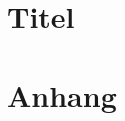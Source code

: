 \documentclass[a4paper,11pt,oneside]{book}
\begin{document}
\chapter{Titel}
\clearpage




\appendix		%
\chapter{Anhang}

\backmatter		%
\clearpage
\end{document}
